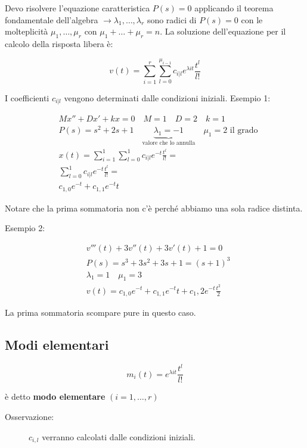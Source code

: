 \documentclass[a4paper, 12pt]{book}
\theoremstyle{plain}
\begin{document}
Devo risolvere l'equazione caratteristica $P(s) = 0$ applicando il teorema fondamentale dell'algebra $\rightarrow \lambda_1, \dots, \lambda_r$
sono radici di $P(s) = 0$ con le molteplicità $\mu_1, \dots, \mu_r$  con $\mu_1 + \dots + \mu_r = n$. La soluzione dell'equazione 
per il calcolo della risposta libera è:

\[
    v(t) = \sum_{i = 1}^r \sum_{l = 0}^{\mu_{i -1}} c_{i | l} e^{\lambda it} \frac{t^l}{l!}
\]

I coefficienti $c_{i | l}$ vengono determinati dalle condizioni iniziali. Esempio 1:

\[
    \begin{split}
        &Mx'' + Dx' + kx = 0 \quad M = 1 \quad D = 2 \quad k = 1 \\
        &P(s) = s^2 + 2s + 1 \quad \underbrace{\lambda_1 = -1}_{\textrm{valore che lo annulla}} \quad \mu_1 = 2 \textrm{ il grado} \\
        &x(t) = \sum_{i = 1}^1 \sum_{l = 0}^1 c_{i | l} e^{-t} \frac{t^l}{l!} = \\
        &\sum_{l = 0}^1 c_{i | l} e^{-t} \frac{t^l}{l!} = \\
        &c_{1, 0} e^{-t} + c_{1, 1} e^{-t} t
    \end{split}
\]

Notare che la prima sommatoria non c'è perché abbiamo una sola radice distinta.

Esempio 2:

\[
    \begin{split}
        &v'''(t) + 3v''(t) + 3v'(t) + 1 = 0 \\
        &P(s) = s^3 + 3s^2 + 3s + 1 = (s + 1)^3 \\
        &\lambda_1 = 1 \quad \mu_1 = 3 \\
        &v(t) = c_{1,0} e^{-t} + c_{1,1} e^{-t}t + c{_1,2} e^{-t} \frac{t^2}{2}
    \end{split}
\]

La prima sommatoria scompare pure in questo caso.

\subsection{Modi elementari}

\[
    m_i(t) = e^{\lambda it} \frac{t^l}{l!}
\]

è detto \textbf{modo elementare} $(i = 1,\dots,r)$

\begin{description}
    \item[Osservazione:] $c_{i,l}$ verranno calcolati dalle condizioni iniziali. 
\end{description}
\end{document}
